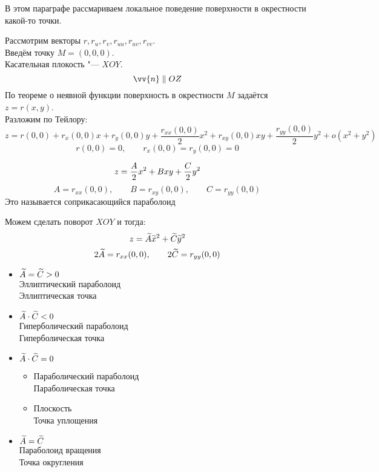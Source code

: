 В этом параграфе рассмариваем локальное поведение поверхности в окрестности какой-то точки.

Рассмотрим векторы $ r, r_u, r_v, r_{uu}, r_{uv}, r_{vv} $. \\
Введём точку $ M = (0, 0, 0) $. \\
Касательная плокость "--- $ XOY $.
$$ \vv{n} \parallel OZ $$
По теореме о неявной функции поверхность в окрестности $ M $ задаётся $ z = r(x, y) $. \\
Разложим по Тейлору:
$$ z = r(0, 0) + r_x(0, 0)x + r_y(0, 0)y + \frac{r_{xx}(0, 0)}2x^2 + r_{xy}(0, 0)xy + \frac{r_{yy}(0, 0)}2y^2 + o(x^2 + y^2) $$
$$ r(0, 0) = 0, \qquad r_x(0, 0) = r_y(0, 0) = 0 $$

\begin{definition}
	$$ z = \half[A]x^2 + Bxy + \half[C]y^2 $$
	$$ A = r_{xx}(0, 0), \qquad B = r_{xy}(0, 0), \qquad C = r_{yy}(0, 0) $$
	Это называется соприкасающийся параболоид
\end{definition}

Можем сделать поворот $ XOY $ и тогда:
$$ z = \vawe{A}\vawe{x}^2 + \vawe{C}\vawe{y}^2 $$
$$ 2\vawe A = r_{xx}(0, 0), \qquad 2\vawe C = r_{yy}(0, 0) $$

\begin{definition}[классификация]
	\hfill
	\begin{itemize}
		\item $ \vawe{A} = \vawe{C} > 0 $ \\
		Эллиптический параболоид \\
		Эллиптическая точка
		\item $ \vawe{A} \cdot \vawe{C} < 0 $ \\
		Гиперболический параболоид \\
		Гиперболическая точка
		\item $ \vawe{A} \cdot \vawe{C} = 0 $
		\begin{itemize}
			\item Параболический параболоид \\
			Параболическая точка
			\item Плоскость \\
			Точка уплощения
		\end{itemize}
		\item $ \vawe{A} = \vawe{C} $ \\
		Параболоид вращения \\
		Точка округления
	\end{itemize}
\end{definition}

